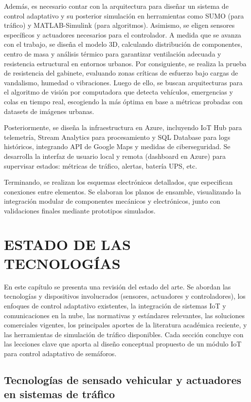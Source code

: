 \documentclass[12pt,a4paper,oneside]{report}
\begin{document}
Además, es necesario contar con la arquitectura para diseñar un sistema de control adaptativo y su posterior simulación en herramientas como SUMO (para tráfico) y MATLAB-Simulink (para algoritmos). Asimismo, se eligen sensores específicos y actuadores necesarios para el controlador. A medida que se avanza con el trabajo, se diseña el modelo 3D, calculando distribución de componentes, centro de masa y análisis térmico para garantizar ventilación adecuada y resistencia estructural en entornos urbanos. Por consiguiente, se realiza la prueba de resistencia del gabinete, evaluando zonas críticas de esfuerzo bajo cargas de vandalismo, humedad o vibraciones. Luego de ello, se buscan arquitecturas para el algoritmo de visión por computadora que detecta vehículos, emergencias y colas en tiempo real, escogiendo la más óptima en base a métricas probadas con datasets de imágenes urbanas.

Posteriormente, se diseña la infraestructura en Azure, incluyendo IoT Hub para telemetría, Stream Analytics para procesamiento y SQL Database para logs históricos, integrando API de Google Maps y medidas de ciberseguridad. Se desarrolla la interfaz de usuario local y remota (dashboard en Azure) para supervisar estados: métricas de tráfico, alertas, batería UPS, etc.

Terminando, se realizan los esquemas electrónicos detallados, que especifican conexiones entre elementos. Se elaboran los planos de ensamble, visualizando la integración modular de componentes mecánicos y electrónicos, junto con validaciones finales mediante prototipos simulados.

\chapter{ESTADO DE LAS TECNOLOGÍAS}\label{capuxedtulo-2-estado-de-las-tecnologuxedas}

En este capítulo se presenta una revisión del estado del arte. Se abordan las tecnologías y dispositivos involucrados (sensores, actuadores y controladores), los enfoques de control adaptativo existentes, la integración de sistemas IoT y comunicaciones en la nube, las normativas y estándares relevantes, las soluciones comerciales vigentes, los principales aportes de la literatura académica reciente, y las herramientas de simulación de tráfico disponibles. Cada sección concluye con las lecciones clave que aporta al diseño conceptual propuesto de un módulo IoT para control adaptativo de semáforos.

\section{Tecnologías de sensado vehicular y actuadores en sistemas de tráfico}\label{tecnologuxedas-de-sensado-vehicular-y-actuadores-en-sistemas-de-truxe1fico}
\end{document}
